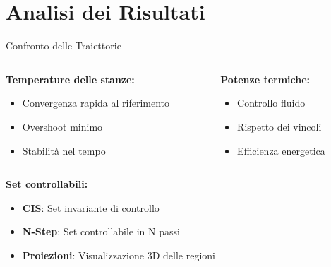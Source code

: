 \documentclass[beamer]{beamer}
\begin{document}
\section{Analisi dei Risultati}

\begin{frame}{Confronto delle Traiettorie}
    \begin{columns}
        \begin{column}{0.5\textwidth}
            \textbf{Temperature delle stanze:}
            \begin{itemize}
                \item Convergenza rapida al riferimento
                \item Overshoot minimo
                \item Stabilità nel tempo
            \end{itemize}
        \end{column}
        \begin{column}{0.5\textwidth}
            \textbf{Potenze termiche:}
            \begin{itemize}
                \item Controllo fluido
                \item Rispetto dei vincoli
                \item Efficienza energetica
            \end{itemize}
        \end{column}
    \end{columns}
    
    \vspace{0.5cm}
    \textbf{Set controllabili:}
    \begin{itemize}
        \item \textbf{CIS}: Set invariante di controllo
        \item \textbf{N-Step}: Set controllabile in N passi
        \item \textbf{Proiezioni}: Visualizzazione 3D delle regioni
    \end{itemize}
\end{frame}
\end{document}

